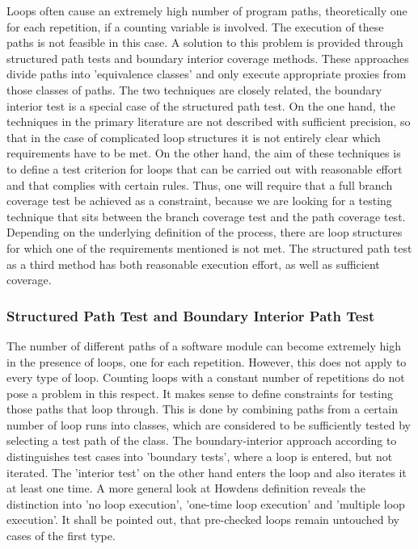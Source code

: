 
	Loops often cause an extremely high number of program paths, theoretically one for each repetition, if a counting variable is involved. The execution of these paths is not feasible in this case. A solution to this problem is provided through structured path tests and boundary interior coverage methods. These approaches divide paths into 'equivalence classes' and only execute appropriate proxies from those classes of paths. The two techniques are closely related, the boundary interior test is a special case of the structured path test. On the one hand, the techniques in the primary literature are not described with sufficient precision, so that in the case of complicated loop structures it is not entirely clear which requirements have to be met. On the other hand, the aim of these techniques is to define a test criterion for loops that can be carried out with reasonable effort and that complies with certain rules. Thus, one will require that a full branch coverage test be achieved as a constraint, because we are looking for a testing technique that sits between the branch coverage test and the path coverage test. Depending on the underlying definition of the process, there are loop structures for which one of the requirements mentioned is not met. The structured path test as a third method has both reasonable execution effort, as well as sufficient coverage.


	\subsubsection{Structured Path Test and Boundary Interior Path Test}

	The number of different paths of a software module can become extremely high in the presence of loops, one for each repetition. However, this does not apply to every type of loop. Counting loops with a constant number of repetitions do not pose a problem in this respect. It makes sense to define constraints for testing those paths that loop through. This is done by combining paths from a certain number of loop runs into classes, which are considered to be sufficiently tested by selecting a test path of the class. The boundary-interior approach according to  distinguishes test cases into 'boundary tests', where a loop is entered, but not iterated. The 'interior test' on the other hand enters the loop and also iterates it at least one time. A more general look at Howdens definition reveals the distinction into 'no loop execution', 'one-time loop execution' and 'multiple loop execution'. It shall be pointed out, that pre-checked loops remain untouched by cases of the first type.


